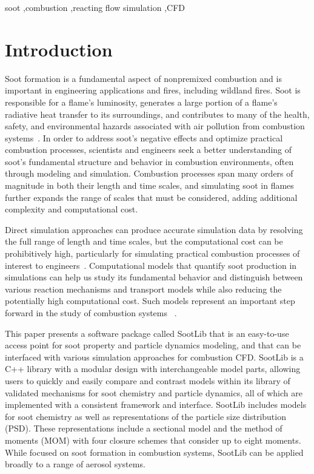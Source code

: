 \documentclass[preprint,letterpaper]{elsarticle}
\begin{document}
\begin{frontmatter}
\begin{keyword}
soot \sep combustion \sep reacting flow simulation \sep CFD
\end{keyword}

\end{frontmatter}




\section{Introduction}
\label{s:intro}

Soot formation is a fundamental aspect of nonpremixed combustion and is important in engineering applications and fires, including wildland fires. Soot is responsible for a flame's luminosity, generates a large portion of a flame's radiative heat transfer to its surroundings, and contributes to many of the health, safety, and environmental hazards associated with air pollution from combustion systems~\cite{EPA_2009,EPA_2004}. In order to address soot's negative effects and optimize practical combustion processes, scientists and engineers seek a better understanding of soot's fundamental structure and behavior in combustion environments, often through modeling and simulation.
Combustion processes span many orders of magnitude in both their length and time scales, and simulating soot in flames further expands the range of scales that must be considered, adding additional complexity and computational cost.

Direct simulation approaches can produce accurate simulation data by resolving the full range of length and time scales, but the computational cost can be prohibitively high, particularly for simulating practical combustion processes of interest to engineers~\cite{Pope_2000}.
Computational models that quantify soot production in simulations can help us study its fundamental behavior and distinguish between various reaction mechanisms and transport models while also reducing the potentially high computational cost. Such models represent an important step forward in the study of combustion systems ~\cite{Frenklach_2002b}.

This paper presents a software package called SootLib that is an easy-to-use access point for soot property and particle dynamics modeling, and that can be interfaced with various simulation approaches for combustion CFD.
SootLib is a C++ library with a modular design with interchangeable model parts, allowing users to quickly and easily compare and contrast models within its library of validated mechanisms for soot chemistry and particle dynamics, all of which are implemented with a consistent framework and interface. 
SootLib includes models for soot chemistry as well as representations of the particle size distribution (PSD). These representations include a sectional model and the method of moments (MOM) with four closure schemes that consider up to eight moments. 
While focused on soot formation in combustion systems, SootLib can be applied broadly to a range of aerosol systems.
\end{document}
